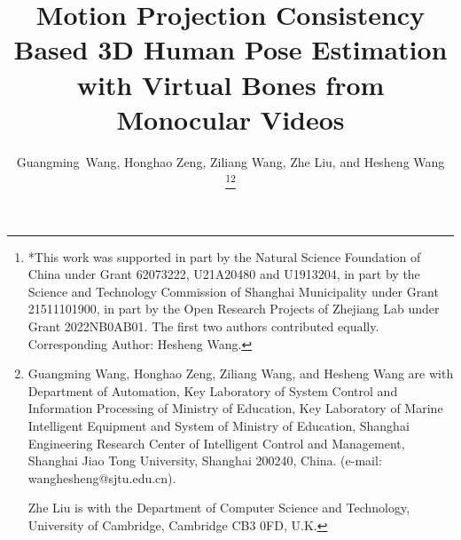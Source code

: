 \documentclass[journal]{IEEEtran}
\begin{document}
\title{Motion Projection Consistency Based 3D Human Pose Estimation with Virtual Bones from Monocular Videos}


\author{Guangming~Wang,
       Honghao Zeng, Ziliang Wang, Zhe Liu, and Hesheng Wang
        
\thanks{*This work was supported in part by the Natural Science Foundation of China under Grant 62073222, U21A20480 and U1913204, in part by the Science and Technology Commission of Shanghai Municipality under Grant 21511101900, in part by the Open Research Projects of Zhejiang Lab under Grant 2022NB0AB01. The first two authors contributed equally. Corresponding Author: Hesheng Wang.}\thanks{Guangming Wang, Honghao Zeng, Ziliang Wang, and Hesheng Wang are with Department of Automation, Key Laboratory of System Control and Information Processing of Ministry of Education, Key Laboratory of Marine Intelligent Equipment and System of Ministry of Education, Shanghai Engineering Research Center of Intelligent Control and Management, Shanghai Jiao Tong University, Shanghai 200240, China. (e-mail: wanghesheng@sjtu.edu.cn).

Zhe Liu is with the Department of Computer Science and Technology,
University of Cambridge, Cambridge CB3 0FD, U.K.

}

}


















\maketitle
\end{document}
